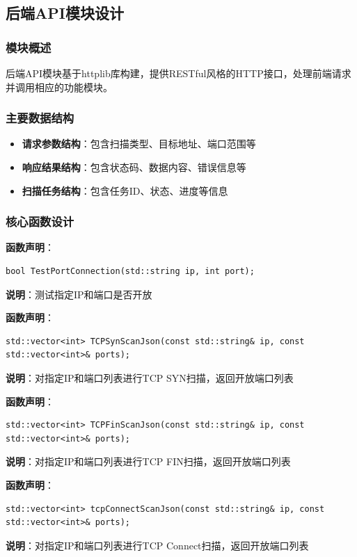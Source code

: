 \documentclass[12pt,hyperref,a4paper,UTF8]{ctexart}
\begin{document}


\subsection{后端API模块设计}

\subsubsection{模块概述}
后端API模块基于httplib库构建，提供RESTful风格的HTTP接口，处理前端请求并调用相应的功能模块。

\subsubsection{主要数据结构}
\begin{itemize}
    \item \textbf{请求参数结构}：包含扫描类型、目标地址、端口范围等
    \item \textbf{响应结果结构}：包含状态码、数据内容、错误信息等
    \item \textbf{扫描任务结构}：包含任务ID、状态、进度等信息
\end{itemize}

\subsubsection{核心函数设计}

\textbf{函数声明}：
\begin{verbatim}
bool TestPortConnection(std::string ip, int port);
\end{verbatim}
\textbf{说明}：测试指定IP和端口是否开放

\textbf{函数声明}：
\begin{verbatim}
std::vector<int> TCPSynScanJson(const std::string& ip, const std::vector<int>& ports);
\end{verbatim}
\textbf{说明}：对指定IP和端口列表进行TCP SYN扫描，返回开放端口列表

\textbf{函数声明}：
\begin{verbatim}
std::vector<int> TCPFinScanJson(const std::string& ip, const std::vector<int>& ports);
\end{verbatim}
\textbf{说明}：对指定IP和端口列表进行TCP FIN扫描，返回开放端口列表

\textbf{函数声明}：
\begin{verbatim}
std::vector<int> tcpConnectScanJson(const std::string& ip, const std::vector<int>& ports);
\end{verbatim}
\textbf{说明}：对指定IP和端口列表进行TCP Connect扫描，返回开放端口列表
\end{document}
